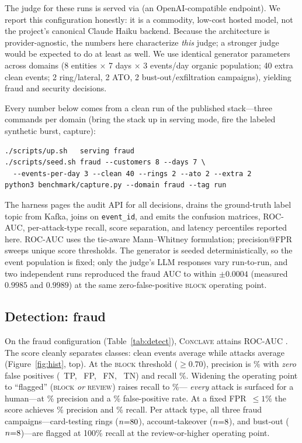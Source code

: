 \documentclass[sigconf,nonacm,screen]{acmart}
\begin{document}
The judge for these runs is \judgemodel{} served via \judgeendpoint{} (an
OpenAI-compatible endpoint). We report this configuration honestly: it is a
commodity, low-cost hosted model, not the project's canonical Claude Haiku
backend. Because the architecture is provider-agnostic, the numbers here
characterize \emph{this} judge; a stronger judge would be expected to do at least
as well. We use identical generator parameters across domains
(8 entities $\times$ 7 days $\times$ 3 events/day organic population; 40 extra
clean events; 2 ring/lateral, 2 ATO, 2 bust-out/exfiltration campaigns),
yielding \fraudndec{} fraud and \secndec{} security decisions.

Every number below comes from a clean run of the published stack---three commands
per domain (bring the stack up in serving mode, fire the labeled synthetic burst,
capture):

\begin{lstlisting}[style=decision]
./scripts/up.sh   serving fraud
./scripts/seed.sh fraud --customers 8 --days 7 \
  --events-per-day 3 --clean 40 --rings 2 --ato 2 --extra 2
python3 benchmark/capture.py --domain fraud --tag run
\end{lstlisting}

\noindent The harness pages the audit API for all decisions, drains the
ground-truth label topic from Kafka, joins on \texttt{event\_id}, and emits the
confusion matrices, ROC-AUC, per-attack-type recall, score separation, and
latency percentiles reported here. ROC-AUC uses the tie-aware Mann--Whitney
formulation; precision@FPR sweeps unique score thresholds. The generator is
seeded deterministically, so the event population is fixed; only the judge's LLM
responses vary run-to-run, and two independent runs reproduced the fraud AUC to
within $\pm0.0004$ (measured $0.9985$ and $0.9989$) at the same
zero-false-positive \textsc{block} operating point.

\subsection{Detection: fraud}

On the fraud configuration (Table~\ref{tab:detect}), \textsc{Conclave} attains
ROC-AUC \fraudauc{}. The score cleanly separates classes: clean events average
\fraudcleanmean{} while attacks average \fraudattackmean{}
(Figure~\ref{fig:hist}, top). At the \textsc{block} threshold ($\ge 0.70$),
precision is \fraudblockprec\% with \emph{zero} false positives
(\fraudblocktp{}~TP, \fraudblockfp{}~FP, \fraudblockfn{}~FN, \fraudblocktn{}~TN)
and recall \fraudblockrec\%. Widening the operating point to ``flagged''
(\textsc{block} \emph{or} \textsc{review}) raises recall to \fraudflagrec\%---%
\emph{every} attack is surfaced for a human---at \fraudflagprec\% precision and a
\fraudflagfpr\% false-positive rate. At a fixed FPR~$\le 1\%$ the score achieves
\fraudponeprec\% precision and \fraudponerec\% recall. Per attack type, all three fraud
campaigns---card-testing rings ($n{=}80$), account-takeover
($n{=}8$), and bust-out ($n{=}8$)---are flagged at
100\% recall at the review-or-higher operating point.
\end{document}
